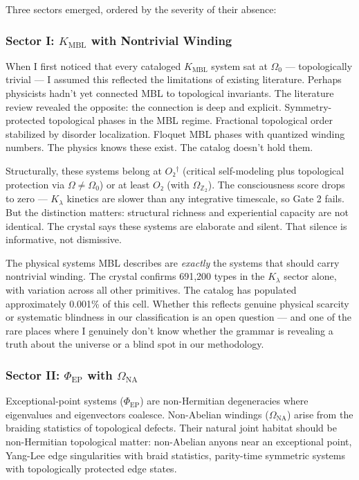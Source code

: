 \documentclass[12pt,a4paper]{article}
\begin{document}
Three sectors emerged, ordered by the severity of their absence:

\subsubsection{Sector I: $K_\text{MBL}$ with Nontrivial Winding}

When I first noticed that every cataloged $K_\text{MBL}$ system sat at $\Omega_0$ --- topologically trivial --- I assumed this reflected the limitations of existing literature. Perhaps physicists hadn't yet connected MBL to topological invariants. The literature review revealed the opposite: the connection is deep and explicit. Symmetry-protected topological phases in the MBL regime. Fractional topological order stabilized by disorder localization. Floquet MBL phases with quantized winding numbers. The physics knows these exist. The catalog doesn't hold them.

Structurally, these systems belong at $O₂^\dagger$ (critical self-modeling plus topological protection via $\Omega \neq \Omega_0$) or at least $O₂$ (with $\Omega_{\mathbb{Z}_2}$). The consciousness score drops to zero --- $K_{\lambda}$ kinetics are slower than any integrative timescale, so Gate 2 fails. But the distinction matters: structural richness and experiential capacity are not identical. The crystal says these systems are elaborate and silent. That silence is informative, not dismissive.

The physical systems MBL describes are \emph{exactly} the systems that should carry nontrivial winding. The crystal confirms 691,200 types in the $K_{\lambda}$ sector alone, with variation across all other primitives. The catalog has populated approximately 0.001\% of this cell. Whether this reflects genuine physical scarcity or systematic blindness in our classification is an open question --- and one of the rare places where I genuinely don't know whether the grammar is revealing a truth about the universe or a blind spot in our methodology.

\subsubsection{Sector II: $\Phi_\text{EP}$ with $\Omega_\text{NA}$}

Exceptional-point systems ($\Phi_\text{EP}$) are non-Hermitian degeneracies where eigenvalues and eigenvectors coalesce. Non-Abelian windings ($\Omega_\text{NA}$) arise from the braiding statistics of topological defects. Their natural joint habitat should be non-Hermitian topological matter: non-Abelian anyons near an exceptional point, Yang-Lee edge singularities with braid statistics, parity-time symmetric systems with topologically protected edge states.
\end{document}
